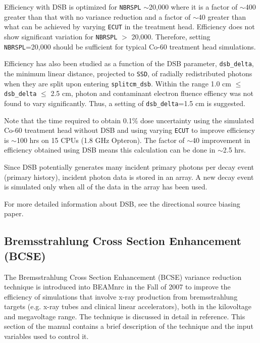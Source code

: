 \documentclass[12pt,twoside]{article}
\begin{document}
Efficiency with DSB is optimized for {\tt NBRSPL} $\sim$20,000 where it is a factor of $\sim$400 greater than that
with no variance reduction and a factor of $\sim$40 greater than what can be achieved by varying {\tt ECUT}
in the treatment head.  Efficiency does not show significant variation for {\tt NBRSPL} $>$ 20,000.  Therefore,
setting {\tt NBRSPL}=20,000 should be sufficient for typical Co-60 treatment head simulations.

Efficiency has also been studied as a function of the DSB parameter, {\tt dsb\_delta}, the minimum linear
distance, projected to {\tt SSD}, of radially redistributed photons when they are split upon entering {\tt splitcm\_dsb}.  Within the range 1.0 cm $\leq$ {\tt dsb\_delta} $\leq$ 2.5 cm, photon and contaminant electron fluence effiency
was not found to vary significantly.  Thus, a setting of {\tt dsb\_delta}=1.5 cm is suggested.

Note that the time required to obtain 0.1\% dose uncertainty using the simulated Co-60 treatment
head\cite{Mo99} without DSB and using varying {\tt ECUT} to improve efficiency is $\sim$100 hrs on 15 CPUs (1.8 GHz Opteron).  The factor of $\sim$40 improvement in efficiency obtained using DSB means this calculation can be done in
$\sim$2.5 hrs.

Since DSB potentially generates many incident primary photons per decay event (primary history), incident photon data is
stored in an array. A new decay event is simulated only when all of the data in the array has been used.

For more detailed information about DSB, see the directional source biasing paper\cite{KW14}.

\subsection[BCSE]{Bremsstrahlung Cross Section Enhancement (BCSE)}
\label{BCSE}

The Bremsstrahlung Cross Section Enhancement (BCSE) variance reduction
technique is introduced into BEAMnrc in the Fall of 2007 to improve
the efficiency of simulations that involve x-ray production from
bremsstrahlung targets (e.g. x-ray tubes and clinical linear
accelerators), both in the kilovoltage and megavoltage range. The
technique is discussed in detail in reference\cite{AR07}. This
section of the manual contains a brief description of the technique
and the input variables used to control it.
\end{document}
